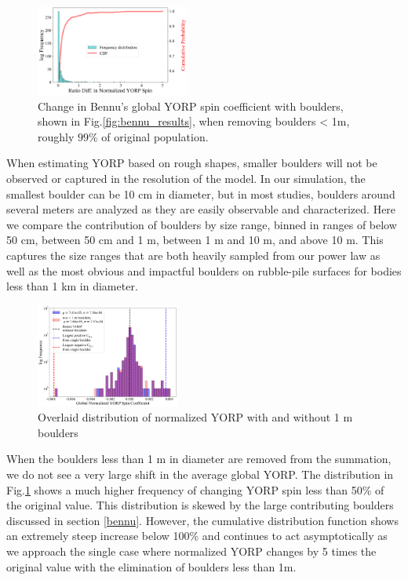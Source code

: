 \begin{figure}
    \centering
    \includegraphics[width=0.45\textwidth]{fig/bennu_difference_yorps.png}
    \caption{Change in Bennu's global YORP spin coefficient with boulders, shown in Fig.\ref{fig:bennu_results}, when removing boulders < 1m, roughly $99\%$ of original population.}
    \label{fig:bennu_diff}
\end{figure}
When estimating YORP based on rough shapes, smaller boulders will not be observed or captured in the resolution of the model. In our simulation, the smallest boulder can be 10 cm in diameter, but in most studies, boulders around several meters are analyzed as they are easily observable and characterized. Here we compare the contribution of boulders by size range, binned in ranges of below 50 cm, between 50 cm and 1 m, between 1 m and 10 m, and above 10 m. This captures the size ranges that are both heavily sampled from our power law as well as the most obvious and impactful boulders on rubble-pile surfaces for bodies less than 1 km in diameter.
\begin{figure}[H]
    \centering
    \includegraphics[width=0.42\textwidth]{fig/bennu_comparison_2.png}
    \caption{Overlaid distribution of normalized YORP with and without 1 m boulders}
    \label{fig:comparison}
\end{figure}
When the boulders less than 1 m in diameter are removed from the summation, we do not see a very large shift in the average global YORP. The distribution in Fig.\ref{fig:bennu_diff} shows a much higher frequency of changing YORP spin less than 50\% of the original value. This distribution is skewed by the large contributing boulders discussed in section \ref{bennu}. However, the cumulative distribution function shows an extremely steep increase below 100\% and continues to act asymptotically as we approach the single case where normalized YORP changes by 5 times the original value with the elimination of boulders less than 1m.

